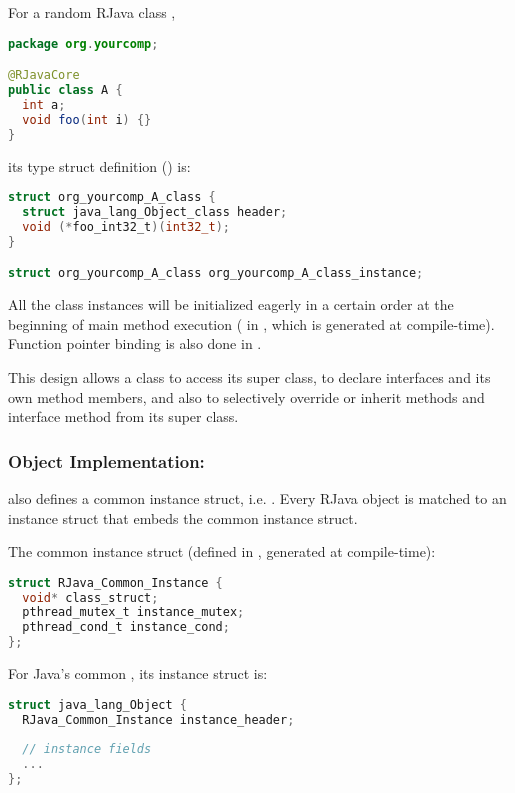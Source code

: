 \documentclass[12pt]{article}
\begin{document}
For a random RJava class , 

\begin{lstlisting}[language=java]
package org.yourcomp;

@RJavaCore
public class A {
  int a;
  void foo(int i) {}
}
\end{lstlisting}

its type struct definition () is:

\begin{lstlisting}[language=c]
struct org_yourcomp_A_class {
  struct java_lang_Object_class header;
  void (*foo_int32_t)(int32_t);
}

struct org_yourcomp_A_class org_yourcomp_A_class_instance;
\end{lstlisting}

All the class instances will be initialized eagerly
in a certain order at the beginning
of main method execution 
( in , which is
generated at compile-time). Function pointer binding
is also done in . 

This design allows a class to access its super class, 
to declare interfaces and its own method members, 
and also to selectively override or inherit
methods and interface method from its super class. 

\subsubsection{Object Implementation: }

\rjc also defines a common instance struct, i.e. . 
Every RJava object is matched to an instance struct that embeds the common instance
struct. 

The common instance struct (defined in , generated at compile-time):
\begin{lstlisting}[language=c]
struct RJava_Common_Instance {
  void* class_struct;
  pthread_mutex_t instance_mutex;
  pthread_cond_t instance_cond;
};
\end{lstlisting}

For Java's common , its instance struct is:
\begin{lstlisting}[language=c]
struct java_lang_Object {
  RJava_Common_Instance instance_header;
    
  // instance fields
  ...
};
\end{lstlisting}
\end{document}
